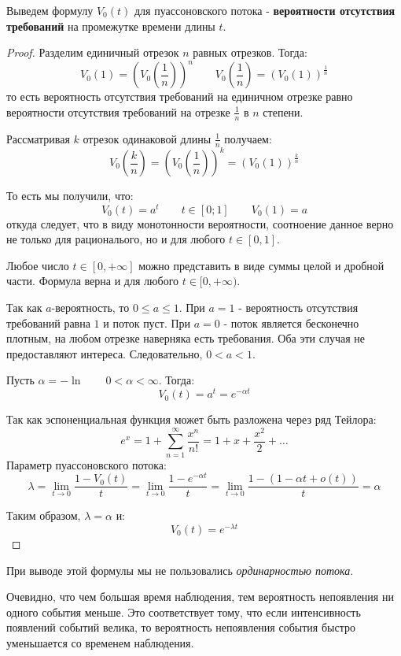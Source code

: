 \documentclass[aps,%
12pt,%
final,%
oneside,
onecolumn,%
musixtex, %
superscriptaddress,%
centertags]{article} %
\theoremstyle{plain}
\theoremstyle{definition}
\theoremstyle{remark}
\begin{document}
Выведем формулу $V_0(t)$ для пуассоновского потока - \textbf{вероятности отсутствия требований} на промежутке времени длины $t$.
\begin{proof}

	Разделим единичный отрезок $n$ равных отрезков. Тогда:
	$$V_0(1) = \left(V_0\left(\frac{1}{n}\right)\right)^n \qquad V_0\left(\frac{1}{n}\right) = \left(V_0(1)\right)^{\frac{1}{n}}$$
	то есть вероятность отсутствия требований на единичном отрезке равно вероятности отсутствия требований на отрезке $\frac{1}{n}$ в $n$ степени.

	Рассматривая $k$ отрезок одинаковой длины $\frac{1}{n}$ получаем:
	$$V_0\left(\frac{k}{n}\right) = \left(V_0\left(\frac{1}{n}\right)\right)^k = \left(V_0(1)\right)^{\frac{k}{n}}$$

	То есть мы получили, что:
	$$V_0(t) = a^t \qquad t \in [0;1] \qquad V_0(1) = a$$
	откуда следует, что в виду монотонности вероятности, соотноение данное верно не только для рациональого, но и для любого $t\in[0,1]$.

	Любое число $t \in [0,+\infty]$ можно представить в виде суммы целой и дробной части. Формула верна и для любого $t \in [0,+\infty)$.

	Так как $a$-вероятность, то $0 \leq a \leq 1$. При $a=1$ - вероятность отсутствия требований равна $1$ и поток пуст. При $a=0$ - поток является бесконечно плотным, на любом отрезке наверняка есть требования. Оба эти случая не предоставляют интереса. Следовательно, $0 < a < 1$.

	Пусть $\alpha = - \ln \qquad 0 < \alpha < \infty$. Тогда:
	$$V_0(t) = a^t = e^{-\alpha t}$$

	Так как эспоненциальная функция может быть разложена через ряд Тейлора:
	$$e^x = 1 + \sum\limits_{n=1}^{\infty} \frac{x^n}{n!} = 1 + x + \frac{x^2}{2} + \ldots $$Параметр пуассоновского потока:
	$$\lambda  =\lim\limits_{t \to 0} \frac{1-V_0(t)}{t} = \lim\limits_{t \to 0}\frac{1-e^{-\alpha t}}{t} = \lim\limits_{t \to 0} \frac{1 - (1 - \alpha t + o(t))}{t} = \alpha$$

	Таким образом, $\lambda = \alpha$ и:
	$$V_0(t) = e^{-\lambda t}$$
\end{proof}

При выводе этой формулы мы не пользовались \textit{ординарностью потока}.

Очевидно, что чем большая время наблюдения, тем вероятность непоявления ни одного события меньше. Это соответствует тому, что если интенсивность появлений событий велика, то вероятность непоявления события быстро уменьшается со временем наблюдения.
\end{document}
